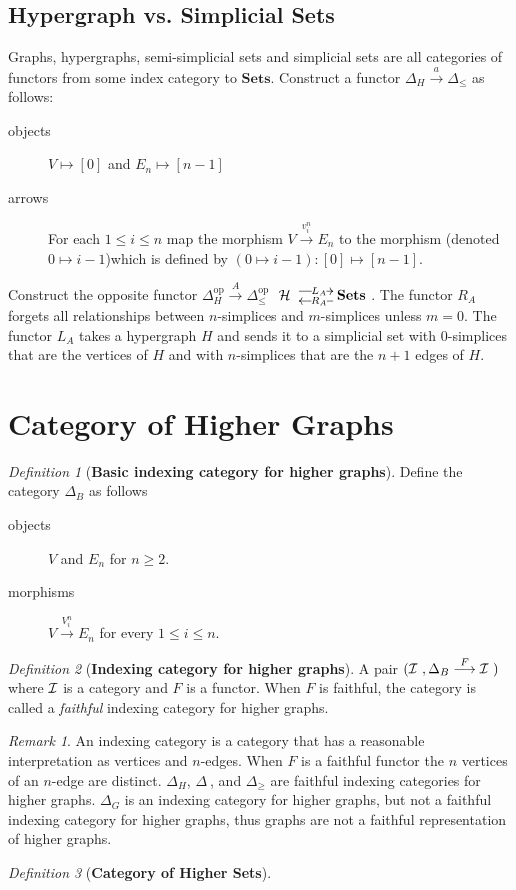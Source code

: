 \documentclass[10pt]{article}
\newcommand{\onearrow}[3]{\mbox{$#1 \stackrel{#2}{\longrightarrow} #3$}}
\newcommand{\calH}{\mbox{${\cal H}\ $}}
\newcommand{\calI}{\mbox{${\cal I}\ $}}
\newcommand{\mapto}[2]{\mbox{$#1 \mapsto #2$}}
\newcommand{\maptob}[3]{\mbox{$(#1): #2 \mapsto #3$}}
\theoremstyle{remark}
\newtheorem{definition}{Definition}
\newtheorem{remark}{Remark}
\begin{document}
\subsection{Hypergraph vs. Simplicial Sets}
Graphs, hypergraphs, semi-simplicial sets and simplicial sets are all categories of functors from some index category to $\mathbf{Sets}$. Construct a functor \onearrow{\Delta_H}{a}{\Delta_{\leq}} as follows:
\begin{description}
\item [objects] \mapto{V}{[0]} and \mapto{E_n}{[n-1]}
\item [arrows] For each $1 \leq i \leq n$ map the morphism \onearrow{V}{v_i^n}{E_n} to the morphism (denoted \mapto{0}{i-1})which is defined by \maptob{\mapto{0}{i-1}}{[0]}{[n-1]}.
\end{description}
Construct the opposite functor \onearrow{\Delta_H^{\text{op}}}{A}{\Delta_{\leq}^{\text{op}}}
$\xymatrix{
\calH \ar@<0.8ex>[r]|{L_A} & \mathbf{Sets} \ar@<0.8ex>[l]|{R_A}
}$.
The functor $R_A$ forgets all relationships between $n$-simplices and $m$-simplices unless $m = 0$. The functor $L_A$ takes a hypergraph $H$ and sends it to a simplicial set with 0-simplices that are the vertices of $H$ and with $n$-simplices that are the $n+1$ edges of $H$.

\section{Category of Higher Graphs}

\begin{definition}[\textbf{Basic indexing category for higher graphs}]
Define the category $\Delta_B$ as follows
\begin{description}
\item [objects] $V$ and $E_n$ for $ n \geq 2$.
\item [morphisms] \onearrow{V}{V_i^n}{E_n} for every $1 \leq i \leq n$.
\end{description}
\end{definition}

\begin{definition}[\textbf{Indexing category for higher graphs}]
A pair $(\calI, \onearrow{\Delta_B}{F}{\calI})$ where \calI is a category and $F$ is a functor. When $F$ is faithful, the category is called a \emph{faithful} indexing category for higher graphs.
\end{definition}

\begin{remark}
An indexing category is a category that has a reasonable interpretation as vertices and $n$-edges. When $F$ is a faithful functor the $n$ vertices of an $n$-edge are distinct. $\Delta_H$, $\Delta_{\>}$, and
$\Delta_{\geq}$ are faithful indexing categories for higher graphs. $\Delta_G$ is an indexing category for higher graphs, but not a faithful indexing category for higher graphs, thus graphs are not a faithful representation of higher graphs.
\end{remark}

\begin{definition}[\textbf{Category of Higher Sets}]
\end{definition}
\end{document}
